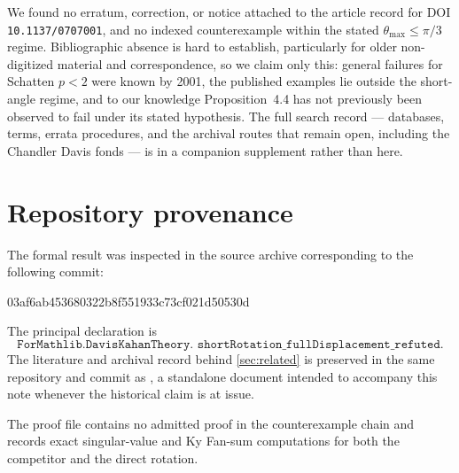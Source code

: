 \documentclass[11pt]{article}
\theoremstyle{definition}
\begin{document}
We found no erratum, correction, or notice attached to the article record for
DOI \texttt{10.1137/0707001}, and no indexed counterexample within the stated
$\theta_{\max}\leq\pi/3$ regime.  Bibliographic absence is hard to establish,
particularly for older non-digitized material and correspondence, so we claim
only this: general failures for Schatten $p<2$ were known by 2001, the
published examples lie outside the short-angle regime, and to our knowledge
Proposition~4.4 has not previously been observed to fail under its stated
hypothesis.  The full search record --- databases, terms, errata procedures,
and the archival routes that remain open, including the Chandler Davis fonds
\cite{ChandlerDavisFonds} --- is in a companion supplement rather than here.

\appendix

\section{Repository provenance}

The formal result was inspected in the source archive corresponding to the
following commit:
\begin{PlainCode}
03af6ab453680322b8f551933c73cf021d50530d
\end{PlainCode}
The principal declaration is
\[
 \texttt{ForMathlib.DavisKahanTheory.
 shortRotation\_fullDisplacement\_refuted}.
\]
The literature and archival record behind \cref{sec:related} is preserved in
the same repository and commit as
, a standalone document intended
to accompany this note whenever the historical claim is at issue.

The proof file contains no admitted proof in the counterexample chain and
records exact singular-value and Ky Fan-sum computations for both the competitor
and the direct rotation.
\end{document}
